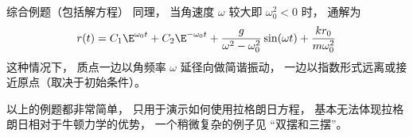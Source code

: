 \begin{example}{综合例题（包括解方程）}
同理， 当角速度 $\omega$ 较大即 $\omega_0^2 < 0$ 时， 通解为
\begin{equation}
r(t) = C_1 \E^{\omega_0 t} + C_2 \E^{-\omega_0 t} + \frac{g}{\omega^2 - \omega_0^2} \sin(\omega t) + \frac{k r_0}{m \omega_0^2}
\end{equation}
这种情况下， 质点一边以角频率 $\omega$ 延径向做简谐振动， 一边以指数形式远离或接近原点（取决于初始条件）。
\end{example}

以上的例题都非常简单， 只用于演示如何使用拉格朗日方程， 基本无法体现拉格朗日相对于牛顿力学的优势， 一个稍微复杂的例子见 “双摆和三摆”。
